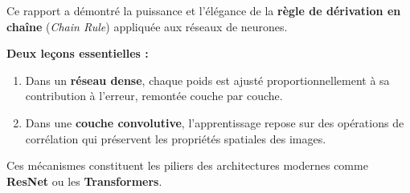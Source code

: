\documentclass[12pt, a4paper]{article}
\begin{document}
Ce rapport a démontré la puissance et l'élégance de la \textbf{règle de
dérivation en chaîne} (\textit{Chain Rule}) appliquée aux réseaux de neurones.

\begin{resultbox}
\textbf{Deux leçons essentielles :}
\begin{enumerate}[noitemsep, leftmargin=1.5cm]
    \item Dans un \textbf{réseau dense}, chaque poids est ajusté proportionnellement
          à sa contribution à l'erreur, remontée couche par couche.
    \item Dans une \textbf{couche convolutive}, l'apprentissage repose sur des
          opérations de corrélation qui préservent les propriétés spatiales des images.
\end{enumerate}
Ces mécanismes constituent les piliers des architectures modernes comme
\textbf{ResNet} ou les \textbf{Transformers}.
\end{resultbox}
\end{document}
